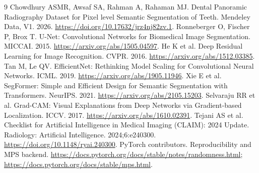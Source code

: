 \documentclass[11pt]{article}
\begin{document}
\begin{thebibliography}{9}\small\setlength{\itemsep}{2pt}
 Chowdhury ASMR, Awsaf SA, Rahman A, Rahaman MJ. Dental Panoramic Radiography Dataset for Pixel level Semantic Segmentation of Teeth. Mendeley Data, V1. 2026. \url{https://doi.org/10.17632/jrz4nj82zv.1}.
 Ronneberger O, Fischer P, Brox T. U-Net: Convolutional Networks for Biomedical Image Segmentation. MICCAI. 2015. \url{https://arxiv.org/abs/1505.04597}.
 He K et al. Deep Residual Learning for Image Recognition. CVPR. 2016. \url{https://arxiv.org/abs/1512.03385}.
 Tan M, Le QV. EfficientNet: Rethinking Model Scaling for Convolutional Neural Networks. ICML. 2019. \url{https://arxiv.org/abs/1905.11946}.
 Xie E et al. SegFormer: Simple and Efficient Design for Semantic Segmentation with Transformers. NeurIPS. 2021. \url{https://arxiv.org/abs/2105.15203}.
 Selvaraju RR et al. Grad-CAM: Visual Explanations from Deep Networks via Gradient-based Localization. ICCV. 2017. \url{https://arxiv.org/abs/1610.02391}.
 Tejani AS et al. Checklist for Artificial Intelligence in Medical Imaging (CLAIM): 2024 Update. Radiology: Artificial Intelligence. 2024;6:e240300. \url{https://doi.org/10.1148/ryai.240300}.
 PyTorch contributors. Reproducibility and MPS backend. \url{https://docs.pytorch.org/docs/stable/notes/randomness.html}; \url{https://docs.pytorch.org/docs/stable/mps.html}.
\end{thebibliography}
\end{document}
